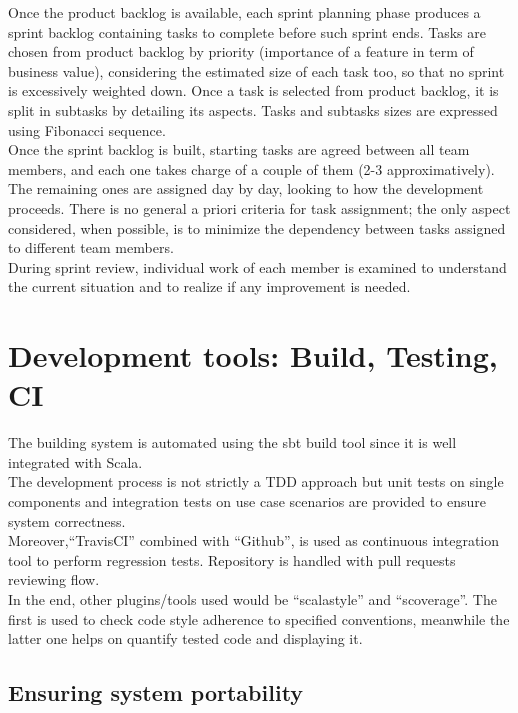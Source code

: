 Once the product backlog is available, each sprint planning phase produces a sprint backlog containing tasks to complete before such sprint ends. Tasks are chosen from product backlog by priority (importance of a feature in term of business value), considering the estimated size of each task too, so that no sprint is excessively weighted down. Once a task is selected from product backlog, it is split in subtasks by detailing its aspects. Tasks and subtasks sizes are expressed using Fibonacci sequence. 
\\
Once the sprint backlog is built, starting tasks are agreed between all team members, and each one takes charge of a couple of them (2-3 approximatively). The remaining ones are assigned day by day, looking to how the development proceeds. There is no general a priori criteria for task assignment; the only aspect considered, when possible, is to minimize the dependency between tasks assigned to different team members. 
\\
During sprint review, individual work of each member is examined to understand the current situation and to realize if any improvement is needed.

\section{Development tools: Build, Testing, CI}

The building system is automated using the sbt build tool since it is well integrated with Scala.
\\
The development process is not strictly a TDD approach but unit tests on single components and integration tests on use case scenarios are provided to ensure system correctness.  
\\
Moreover,``TravisCI'' combined with ``Github'', is used as continuous integration tool to perform regression tests. Repository is handled with pull requests reviewing flow.
\\
In the end, other plugins/tools used would be ``scalastyle'' and ``scoverage''. The first is used to check code style adherence to specified conventions, meanwhile the latter one helps on quantify tested code and displaying it.

\subsection{Ensuring system portability}

